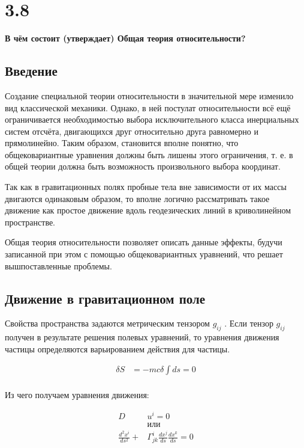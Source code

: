 \documentclass[a4paper,14pt]{article}
\begin{document}
\section*{3.8}

\begin{center}
	\LARGE{\textbf{В чём состоит (утверждает) Общая теория относительности?}}\\
\end{center}

\subsection*{Введение}

	Создание специальной теории относительности в значительной мере изменило вид классической механики. Однако, в ней постулат относительности всё ещё ограничивается необходимостью выбора исключительного класса инерциальных систем отсчёта, двигающихся друг относительно друга равномерно и прямолинейно. Таким образом, становится вполне понятно, что общековариантные уравнения должны быть лишены этого ограничения, т. е. в общей теории должна быть возможность произвольного выбора координат.

	Так как в гравитационных полях пробные тела вне зависимости от их массы двигаются одинаковым образом, то вполне логично рассматривать такое движение как простое движение вдоль геодезических линий в криволинейном пространстве. 

	Общая теория относительности позволяет описать данные эффекты, будучи записанной при этом с помощью общековариантных уравнений, что решает вышпоставленные проблемы. 

\subsection*{Движение в гравитационном поле}

	Свойства пространства задаются метрическим тензором $ g_{ij} $ . Если тензор $ g_{ij} $
	получен в результате решения полевых уравнений, то уравнения движения частицы определяются варьированием действия для частицы. 

	\begin{align*}
		\delta S & = -mc \delta \int ds = 0 \\
	\end{align*}

	Из чего получаем уравнения движения:

	\begin{align*}
		D & u^i = 0 \\
		& или      \\
		\frac{d^2 x^i}{ds^2} + & \Gamma_{jk}^i \frac{dx^j}{ds} \frac{dx^k}{ds} = 0 \\
	\end{align*}
\end{document}
